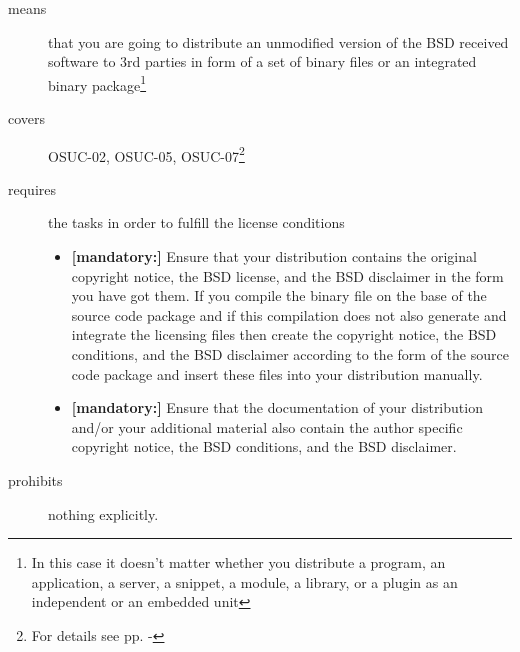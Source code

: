 \begin{description}
\item[means] that you are going to distribute an unmodified version of the BSD
received software to 3rd parties in form of a set of binary files or an
integrated bi\-na\-ry package\footnote{In this case it doesn't matter whether
you distribute a program, an application, a server, a snippet, a module, a library,
or a plugin as an independent or an embedded unit}
\item[covers] OSUC-02, OSUC-05, OSUC-07\footnote{For details see pp.
\pageref{OSUC-02-DEF} - \pageref{OSUC-07-DEF}}
\item[requires] the tasks in order to fulfill the license conditions
\begin{itemize}
  \item  \textbf{[mandatory:]} Ensure that your distribution contains the
  original copyright notice, the BSD license, and the BSD disclaimer in the form
  you have got them. If you compile the binary file on the base of the source
  code package and if this compilation does not also generate and integrate the
  licensing files then create the copyright notice, the BSD conditions, and the
  BSD disclaimer according to the form of the source code package and insert
  these files into your distribution manually.
  \item  \textbf{[mandatory:]} Ensure that the documentation of your
  distribution and/or your additional material also contain the author specific
  copyright notice, the BSD conditions, and the BSD disclaimer.
\end{itemize}
\item[prohibits] nothing explicitly.
\end{description}

